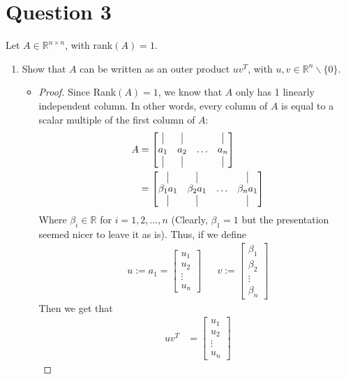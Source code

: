 \documentclass[10pt,a4paper]{article}
\theoremstyle{definition}
\theoremstyle{definition}
\numberwithin{equation}{section}
\begin{document}
\section*{Question 3}
Let $A \in \mathbb{R}^{n \times n}$, with rank$(A) = 1$. 
\begin{enumerate}[label = (\alph*)]
\item Show that $A$ can be written as an outer product $uv^T$, with $u, v \in \mathbb{R}^n \backslash \{0\}$. 
	\begin{itemize}
	\item \begin{proof}
	Since Rank$(A) = 1$, we know that $A$ only has 1 linearly independent column. In other words, every column of $A$ is equal to a scalar multiple of the first column of $A$:
	\begin{align*}
	A &= \begin{bmatrix}
	\vline & \vline & & \vline\\
	a_1 & a_2 & \ldots & a_n\\
	\vline & \vline & & \vline
	\end{bmatrix}\\
	&= \begin{bmatrix}
	\vline & \vline & & \vline\\
	\beta_1 a_1 & \beta_2 a_1 & \ldots & \beta_n a_1\\
	\vline & \vline & & \vline
	\end{bmatrix}
	\end{align*}
	Where $\beta_i \in \mathbb{R}$ for $i = 1, 2, \ldots, n$ (Clearly, $\beta_1 = 1$ but the presentation seemed nicer to leave it as is). Thus, if we define 
	\begin{align*}
	u := a_1 = \begin{bmatrix}
	u_1\\u_2\\\vdots\\u_n
	\end{bmatrix} && v := \begin{bmatrix}
	\beta_1\\\beta_2\\\vdots\\\beta_n
	\end{bmatrix}
	\end{align*}
	Then we get that
	\begin{align*}
	uv^T &= \begin{bmatrix}
	u_1\\u_2\\\vdots\\u_n

\end{bmatrix}
\end{align*}
\end{proof}
\end{itemize}
\end{enumerate}
\end{document}
